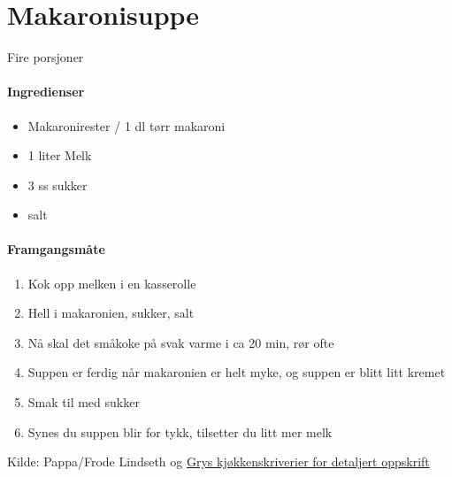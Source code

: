 \section{Makaronisuppe}
\label{Makaronisuppe}

Fire porsjoner

\paragraph{Ingredienser}
\begin{itemize}[noitemsep]
	\item Makaronirester / 1 dl tørr makaroni
	\item 1 liter Melk
	\item 3 ss sukker
	\item salt
\end{itemize}

\paragraph{Framgangsmåte}
\begin{enumerate}[noitemsep]
	\item   Kok opp melken i en kasserolle
	\item   Hell i makaronien, sukker, salt
	\item   Nå skal det småkoke på svak varme i ca 20 min, rør ofte
 	\item   Suppen er ferdig når makaronien  er helt myke, og suppen er blitt litt kremet
	\item   Smak til med sukker
	\item   Synes du suppen blir for tykk, tilsetter du litt mer melk
\end{enumerate}

Kilde: Pappa/Frode Lindseth og \href{http://gryskjokken.no/2012/05/makaronisuppe-som-mormor-lagde-den/}{ Grys kjøkkenskriverier for detaljert oppskrift}
